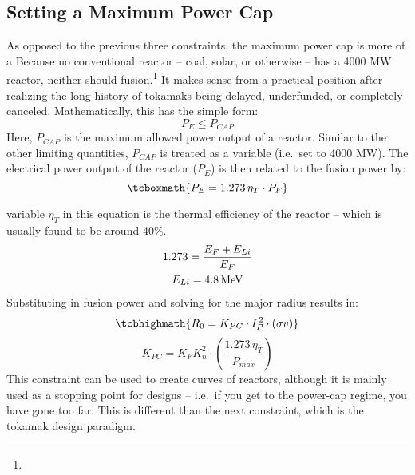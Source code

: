 \subsection{Setting a Maximum Power Cap}

As opposed to the previous three  constraints, the maximum power cap is more of a  Because no conventional reactor -- coal, solar, or otherwise -- has a 4000 MW reactor, neither should fusion.\footnote{} It makes sense from a practical position after realizing the long history of tokamaks being delayed, underfunded, or completely canceled. Mathematically, this has the simple form:
\begin{equation}
	P_E \le P_{CAP}
\end{equation}
Here, $P_{CAP}$ is the maximum allowed power output of a reactor. Similar to the other limiting quantities, $P_{CAP}$ is treated as a  variable (i.e.\ set to 4000 MW). The electrical power output of the reactor ($P_E$) is then related to the fusion power by: \cite{jeff} 
\begin{equation}
	\tcboxmath{
	P_E = 1.273 \, \eta_T \cdot P_F
	}
\end{equation}

 variable $\eta_T$ in this equation is the thermal efficiency of the reactor -- which is usually found to be around 40\%. 
\begin{gather}
	1.273 = \frac{ E_F + E_{Li} }{ E_F } \\
	E_{Li} = 4.8 \, \textnormal{MeV}
\end{gather}
Substituting in fusion power and solving for the major radius results in:
\begin{equation}
	\label{eq:r_pcap}
	\tcbhighmath{ R_0 = K_{PC} \cdot I_P^{\,2} \cdot (\sigma v) }
\end{equation}
\begin{equation}
	K_{PC} = K_F K_n^2 \cdot \left( \frac{ 1.273 \, \eta_T }{ P_{max} } \right)
\end{equation}
This  constraint can be used to create curves of reactors, although it is mainly used as a stopping point for designs -- i.e.\ if you get to the power-cap regime, you have gone too far. This is different than the next constraint, which is  the  tokamak design paradigm.
